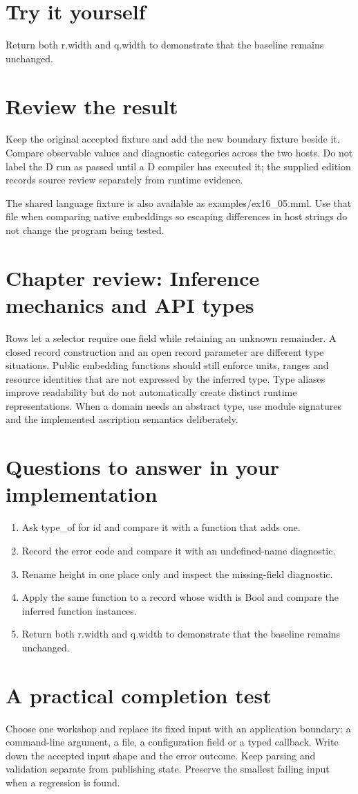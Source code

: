 \section*{Try it yourself}
Return both r.width and q.width to demonstrate that the baseline remains unchanged.

\section*{Review the result}
Keep the original accepted fixture and add the new boundary fixture beside it. Compare observable values and diagnostic categories across the two hosts. Do not label the D run as passed until a D compiler has executed it; the supplied edition records source review separately from runtime evidence.

The shared language fixture is also available as examples/ex16\_05.mml. Use that file when comparing native embeddings so escaping differences in host strings do not change the program being tested.

\clearpage
\section*{Chapter review: Inference mechanics and API types}
Rows let a selector require one field while retaining an unknown remainder. A closed record construction and an open record parameter are different type situations. Public embedding functions should still enforce units, ranges and resource identities that are not expressed by the inferred type. Type aliases improve readability but do not automatically create distinct runtime representations. When a domain needs an abstract type, use module signatures and the implemented ascription semantics deliberately.

\section*{Questions to answer in your implementation}
\begin{enumerate}
\item Ask type\_of for id and compare it with a function that adds one.
\item Record the error code and compare it with an undefined-name diagnostic.
\item Rename height in one place only and inspect the missing-field diagnostic.
\item Apply the same function to a record whose width is Bool and compare the inferred function instances.
\item Return both r.width and q.width to demonstrate that the baseline remains unchanged.
\end{enumerate}
\section*{A practical completion test}
Choose one workshop and replace its fixed input with an application boundary: a command-line argument, a file, a configuration field or a typed callback. Write down the accepted input shape and the error outcome. Keep parsing and validation separate from publishing state. Preserve the smallest failing input when a regression is found.

